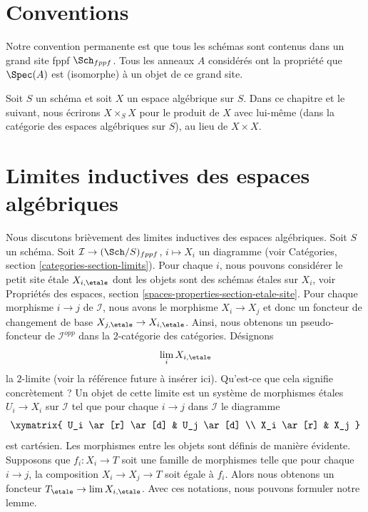\section{Conventions}
\label{section-conventions}

\noindent
Notre convention permanente est que tous les schémas sont contenus dans
un grand site fppf $\Sch_{fppf}$. Tous les anneaux $A$ considérés
ont la propriété que $\Spec(A)$ est (isomorphe) à un
objet de ce grand site.

\medskip\noindent
Soit $S$ un schéma et soit $X$ un espace algébrique sur $S$.
Dans ce chapitre et le suivant, nous écrirons $X \times_S X$
pour le produit de $X$ avec lui-même (dans la catégorie des espaces algébriques sur $S$), au lieu de $X \times X$.




\section{Limites inductives des espaces algébriques}
\label{section-pushouts-generalities}

\noindent
Nous discutons brièvement des limites inductives des espaces algébriques. Soit $S$ un schéma.
Soit $\mathcal{I} \to (\Sch/S)_{fppf}$, $i \mapsto X_i$
un diagramme (voir Catégories, section \ref{categories-section-limits}).
Pour chaque $i$, nous pouvons considérer le petit site \'etale $X_{i, \etale}$
dont les objets sont des schémas \'etales sur $X_i$, voir
Propriétés des espaces, section \ref{spaces-properties-section-etale-site}.
Pour chaque morphisme $i \to j$ de $\mathcal{I}$, nous avons le morphisme
$X_i \to X_j$ et donc un foncteur de changement de base
$X_{j, \etale} \to X_{i, \etale}$.
Ainsi, nous obtenons un pseudo-foncteur de $\mathcal{I}^{opp}$ dans
la $2$-catégorie des catégories. Désignons
$$
\lim_i X_{i, \etale}
$$
la $2$-limite (voir la référence future à insérer ici). Qu'est-ce que cela signifie
concrètement ? Un objet de cette limite est un système de morphismes \'etales
$U_i \to X_i$ sur $\mathcal{I}$ tel que pour chaque $i \to j$ dans $\mathcal{I}$ le diagramme
$$
\xymatrix{
U_i \ar[r] \ar[d] & U_j \ar[d] \\
X_i \ar[r] & X_j
}
$$
est cartésien. Les morphismes entre les objets sont définis de manière évidente.
Supposons que $f_i : X_i \to T$ soit une famille de morphismes telle que
pour chaque $i \to j$, la composition $X_i \to X_j \to T$ soit égale à $f_i$.
Alors nous obtenons un foncteur $T_\etale \to \lim X_{i, \etale}$.
Avec ces notations, nous pouvons formuler notre lemme.

